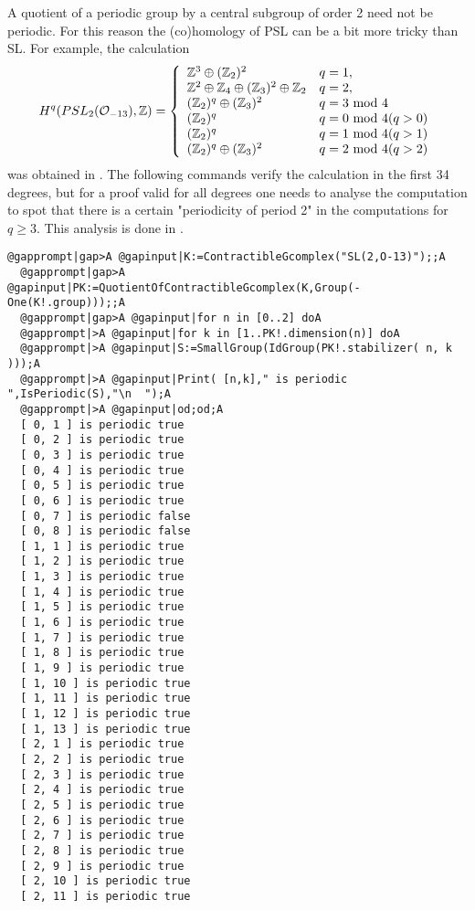 \documentclass[a4paper,11pt]{report}
\begin{document}
{{\begin{Verbatim}[commandchars=@|A,fontsize=\small,frame=single,label=Example]
\end{Verbatim}
 A quotient of a periodic group by a central subgroup of order 2 need not be
periodic. For this reason the (co)homology of PSL can be a bit more tricky
than SL. For example, the calculation 
\[H^q(PSL_2({\cal O}_{-13}),\mathbb Z) = \left\{\begin{array}{ll} \mathbb Z^3
\oplus (\mathbb Z_2)^2 & q=1,\\ \mathbb Z^2 \oplus \mathbb Z_4 \oplus (\mathbb
Z_3)^2 \oplus \mathbb Z_2 & q=2,\\ (\mathbb Z_2)^q \oplus (\mathbb Z_{3})^2 &
q= 3 {\rm \ mod\ } 4\\ (\mathbb Z_2)^q & q= 0 {\rm \ mod\ } 4 (q>0)\\ (\mathbb
Z_2)^q & q= 1 {\rm \ mod\ } 4 (q>1)\\ (\mathbb Z_2)^q \oplus (\mathbb Z_{3})^2
& q= 2 {\rm \ mod\ } 4 (q > 2)\\ \end{array}\right. \]
 was obtained in \cite{Rahm11}. The following commands verify the calculation in the first 34 degrees, but
for a proof valid for all degrees one needs to analyse the computation to spot
that there is a certain "periodicity of period 2" in the computations for $q\ge 3$. This analysis is done in \cite{Rahm11}. 
\begin{Verbatim}[commandchars=@|A,fontsize=\small,frame=single,label=Example]
  @gapprompt|gap>A @gapinput|K:=ContractibleGcomplex("SL(2,O-13)");;A
  @gapprompt|gap>A @gapinput|PK:=QuotientOfContractibleGcomplex(K,Group(-One(K!.group)));;A
  @gapprompt|gap>A @gapinput|for n in [0..2] doA
  @gapprompt|>A @gapinput|for k in [1..PK!.dimension(n)] doA
  @gapprompt|>A @gapinput|S:=SmallGroup(IdGroup(PK!.stabilizer( n, k )));A
  @gapprompt|>A @gapinput|Print( [n,k]," is periodic ",IsPeriodic(S),"\n  ");A
  @gapprompt|>A @gapinput|od;od;A
  [ 0, 1 ] is periodic true
  [ 0, 2 ] is periodic true
  [ 0, 3 ] is periodic true
  [ 0, 4 ] is periodic true
  [ 0, 5 ] is periodic true
  [ 0, 6 ] is periodic true
  [ 0, 7 ] is periodic false
  [ 0, 8 ] is periodic false
  [ 1, 1 ] is periodic true
  [ 1, 2 ] is periodic true
  [ 1, 3 ] is periodic true
  [ 1, 4 ] is periodic true
  [ 1, 5 ] is periodic true
  [ 1, 6 ] is periodic true
  [ 1, 7 ] is periodic true
  [ 1, 8 ] is periodic true
  [ 1, 9 ] is periodic true
  [ 1, 10 ] is periodic true
  [ 1, 11 ] is periodic true
  [ 1, 12 ] is periodic true
  [ 1, 13 ] is periodic true
  [ 2, 1 ] is periodic true
  [ 2, 2 ] is periodic true
  [ 2, 3 ] is periodic true
  [ 2, 4 ] is periodic true
  [ 2, 5 ] is periodic true
  [ 2, 6 ] is periodic true
  [ 2, 7 ] is periodic true
  [ 2, 8 ] is periodic true
  [ 2, 9 ] is periodic true
  [ 2, 10 ] is periodic true
  [ 2, 11 ] is periodic true
  

\end{Verbatim}}}
\end{document}
